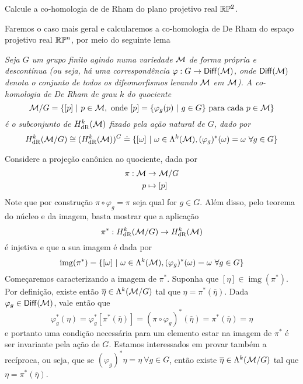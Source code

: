 \begin{Mybox}
Calcule a co-homologia de de Rham do plano projetivo real $\P^2$.
\vspace{-.4cm}
\end{Mybox}
\vspace{-.4cm}

\begin{dem}
Faremos o caso mais geral e calcularemos a co-homologia de De Rham do espaço projetivo real $\P^n$, por meio do seguinte lema
\begin{lema}\label{quociente}
\emph{
Seja $G$ um grupo finito agindo numa variedade $\mm$ de forma própria e descontínua (ou seja, há uma correspondência $\varphi: G \to \sf{Diff}(\mm)$, onde $\sf{Diff}(\mm)$ denota o conjunto de todos os difeomorfismos levando $\mm$ em $\mm$). A co-homologia de De Rham de grau $k$ do quociente
\[
\mm/G = \{[p] \ \vert \ p \in \mm, \text{ onde } [p] = \{\varphi_g(p) \ \vert \ g \in G \} \text{ para cada } p \in \mm\}
\]
é o subconjunto de $H^k_{\text{dR}}(\mm)$ fixado pela ação natural de $G$, dado por
\[
H^k_{\text{dR}}(\mm / G) \cong (H^k_{\text{dR}}(\mm))^G \doteq \{[\omega] \ \vert \ \omega \in \Lambda^k(\mm), (\varphi_g)^{\ast}(\omega) = \omega \ \forall g \in G \}
\]
}
\end{lema}
\begin{demm}
Considere a projeção canônica ao quociente, dada por
\begin{align*}
\pi: \mm &\to \mm/G \\
p &\mapsto [p]
\end{align*}
Note que por construção $\pi \circ \varphi_g = \pi$ seja qual for $g \in G$. Além disso, pelo teorema do núcleo e da imagem, basta mostrar que a aplicação $$\pi^{\ast}: H^k_{\text{dR}}(\mm / G) \to H^k_{\text{dR}}(\mm)$$ é injetiva e que a sua imagem é dada por
\[
\operatorname{img}(\pi^{\ast}) = \{[\omega] \ \vert \ \omega \in \Lambda^k(\mm), (\varphi_g)^{\ast}(\omega) = \omega \ \forall g \in G \}
\]
Começaremos caracterizando a imagem de $\pi^{\ast}$. Suponha que $[\eta] \in \operatorname{img}(\pi^{\ast})$. Por definição, existe então $\overline{\eta} \in \Lambda^k(\mm / G)$ tal que $\eta = \pi^{\ast}(\overline{\eta})$. Dada $\varphi_g \in \sf{Diff}(\mm)$, vale então que
\[
\varphi_g^{\ast} (\eta) = \varphi_g^{*}\left[ \pi^{\ast}(\overline{\eta}) \right] = \left(\pi \circ \varphi_g \right)^{\ast}(\overline{\eta}) = \pi^{\ast}(\overline{\eta}) = \eta
\]
e portanto uma condição necessária para um elemento estar na imagem de $\pi^{\ast}$ é ser invariante pela ação de $G$. Estamos interessados em provar também a recíproca, ou seja, que se $(\varphi_g)^{\ast}\eta = \eta \ \forall g \in G$, então existe $\overline{\eta} \in \Lambda^k(\mm / G)$ tal que $\eta = \pi^{\ast}(\overline{\eta})$. \par 

\end{demm}
\end{dem}
